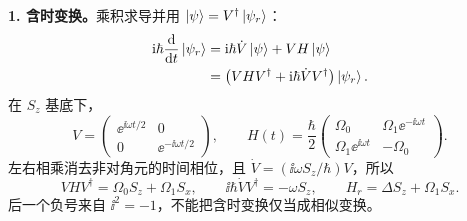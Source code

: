 \begin{checkedsolution}
\textbf{1. 含时变换。}乘积求导并用 $\left|\psi\right\rangle=V^\dagger\left|\psi_r\right\rangle$：
\begin{align}
  \mathrm{i}\hbar\frac{\mathop{}\!\mathrm{d}}{\mathop{}\!\mathrm{d} t}\left|\psi_r\right\rangle
    &=\mathrm{i}\hbar\dot V\left|\psi\right\rangle+VH\left|\psi\right\rangle\notag\\
    &=\left(VHV^\dagger+\mathrm{i}\hbar\dot VV^\dagger\right)\left|\psi_r\right\rangle.
\end{align}
在 $S_z$ 基底下，
\begin{equation}
  V=\begin{pmatrix}\ee^{\ii\omega t/2}&0\\0&\ee^{-\ii\omega t/2}\end{pmatrix},
  \qquad H(t)=\frac\hbar2
    \begin{pmatrix}\Omega_0&\Omega_1\ee^{-\ii\omega t}\\
      \Omega_1\ee^{\ii\omega t}&-\Omega_0\end{pmatrix}.
\end{equation}
左右相乘消去非对角元的时间相位，且 $\dot V=(\ii\omega S_z/\hbar)V$，所以
\begin{equation}
  VHV^\dagger=\Omega_0S_z+\Omega_1S_x,\qquad
  \ii\hbar\dot VV^\dagger=-\omega S_z,
  \qquad \boxed{H_r=\Delta S_z+\Omega_1S_x.}
\end{equation}
后一个负号来自 $\ii^2=-1$，不能把含时变换仅当成相似变换。


\end{checkedsolution}
